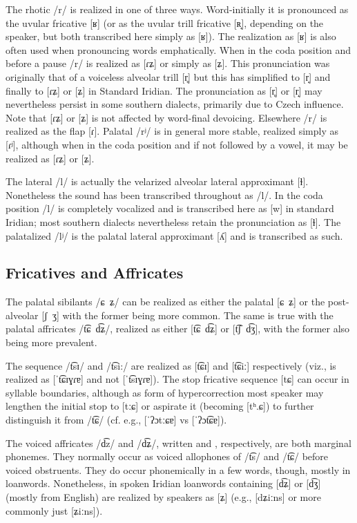 The rhotic /r/ is realized in one of three ways. Word-initially it is pronounced as the uvular fricative [ʁ] (or as the uvular trill fricative [ʀ̝], depending on the speaker, but both transcribed here simply as [ʁ]). The realization as [ʁ] is also often used when pronouncing words emphatically. When in the coda position and before a pause /r/ is realized as [ɾʑ] or simply as [ʑ]. This pronunciation was originally that of a voiceless alveolar trill [r̥] but this has simplified to [r̝] and finally to [ɾʑ] or [ʑ] in Standard Iridian. The  pronunciation as [r̥] or [r̝] may nevertheless persist in some southern dialects, primarily due to Czech influence. Note that [ɾʑ] or [ʑ] is not affected by word-final devoicing. Elsewhere /r/ is realized as the flap [ɾ]. Palatal /rʲ/ is in general more stable, realized simply as [ɾʲ], although when in the coda position and if not followed by a vowel, it may be realized as [ɾʑ] or [ʑ].

The lateral /l/ is actually the velarized alveolar lateral approximant [ɫ]. Nonetheless the sound has been transcribed throughout as /l/. In the coda position /l/ is completely vocalized and is transcribed here as [w] in standard Iridian; most southern dialects nevertheless retain the pronunciation as [ɫ]. The palatalized /lʲ/ is the palatal lateral approximant [ʎ] and is transcribed as such.

\subsection{Fricatives and Affricates}

The palatal sibilants /ɕ~ʑ/ can be realized as either the palatal [ɕ~ʑ] or
the post-alveolar [ʃ~ʒ] with the former being more common. The same is true
with the palatal affricates /t͡ɕ~d͡ʑ/, realized as either [t͡ɕ~d͡ʑ] or [t͡ʃ~d͡ʒ],
with the former also being more prevalent.

The sequence /t͡sɪ/ and /t͡si:/ are realized as [t͡ɕɪ] and [t͡ɕiː] respectively
(viz.,  is realized as [ˈt͡ɕɪɣɾɐ] and not [ˈt͡sɪɣɾɐ]).
The stop fricative sequence [tɕ] can occur in syllable boundaries,
although as form of hypercorrection most speaker may lengthen the initial
stop to [tːɕ] or aspirate it (becoming [tʰ.ɕ]) to further distinguish it
from /t͡ɕ/ (cf. e.g.,  [ˈʔɔtːɕɐ] vs 
[ˈʔɔt͡ɕɐ]).

The voiced affricates /d͡z/ and /d͡ʑ/, written  and , respectively, are both marginal phonemes. They normally occur as voiced allophones of  /t͡s/ and /t͡ɕ/ before voiced obstruents. They do occur phonemically in a few words, though, mostly in loanwords. Nonetheless, in spoken Iridian loanwords containing [d͡ʑ] or [d͡ʒ] (mostly from English) are realized by speakers as [ʑ] (e.g.,  [dʑiːns] or more commonly just [ʑiːns]).


